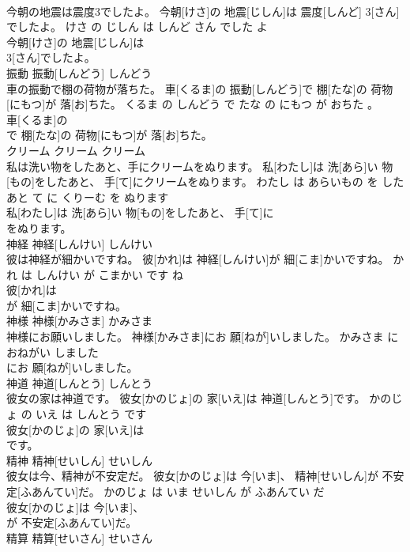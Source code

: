 \documentclass[8pt]{extreport}
\begin{document}
\begin{CJK}{UTF8}{min}
\\	今朝の地震は震度3でしたよ。	今朝[けさ]の 地震[じしん]は 震度[しんど] 3[さん]でしたよ。	けさ の じしん は しんど さん でした よ	
\\	今朝[けさ]の 地震[じしん]は
\\	3[さん]でしたよ。			
\\	振動	振動[しんどう]	しんどう	
\\	車の振動で棚の荷物が落ちた。	車[くるま]の 振動[しんどう]で 棚[たな]の 荷物[にもつ]が 落[お]ちた。	くるま の しんどう で たな の にもつ が おちた 。	
\\	車[くるま]の
\\	で 棚[たな]の 荷物[にもつ]が 落[お]ちた。			
\\	クリーム	クリーム	クリーム	
\\	私は洗い物をしたあと、手にクリームをぬります。	私[わたし]は 洗[あら]い 物[もの]をしたあと、 手[て]にクリームをぬります。	わたし は あらいもの を した あと て に くりーむ を ぬります	
\\	私[わたし]は 洗[あら]い 物[もの]をしたあと、 手[て]に
\\	をぬります。			
\\	神経	神経[しんけい]	しんけい	
\\	彼は神経が細かいですね。	彼[かれ]は 神経[しんけい]が 細[こま]かいですね。	かれ は しんけい が こまかい です ね	
\\	彼[かれ]は
\\	が 細[こま]かいですね。			
\\	神様	神様[かみさま]	かみさま	
\\	神様にお願いしました。	神様[かみさま]にお 願[ねが]いしました。	かみさま に おねがい しました	
\\	にお 願[ねが]いしました。			
\\	神道	神道[しんとう]	しんとう	
\\	彼女の家は神道です。	彼女[かのじょ]の 家[いえ]は 神道[しんとう]です。	かのじょ の いえ は しんとう です	
\\	彼女[かのじょ]の 家[いえ]は
\\	です。			
\\	精神	精神[せいしん]	せいしん	
\\	彼女は今、精神が不安定だ。	彼女[かのじょ]は 今[いま]、 精神[せいしん]が 不安定[ふあんてい]だ。	かのじょ は いま せいしん が ふあんてい だ	
\\	彼女[かのじょ]は 今[いま]、
\\	が 不安定[ふあんてい]だ。			
\\	精算	精算[せいさん]	せいさん	

\end{CJK}
\end{document}
